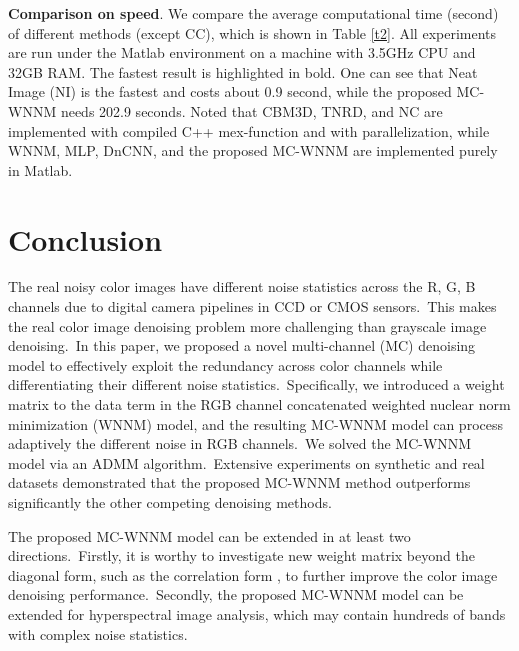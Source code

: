 \textbf{Comparison on speed}. We compare the average computational time (second) of different methods (except CC), which is shown in Table \ref{t2}. All experiments are run under the Matlab environment on a machine with 3.5GHz CPU and 32GB RAM. The fastest result is highlighted in bold. One can see that Neat Image (NI) is the fastest and costs about 0.9 second, while the proposed MC-WNNM needs 202.9 seconds. Noted that CBM3D, TNRD, and NC are implemented with compiled C++ mex-function and with parallelization, while WNNM, MLP, DnCNN, and the proposed MC-WNNM are implemented purely in Matlab.


\section{Conclusion}

The real noisy color images have different noise statistics across the R, G, B channels due to digital camera pipelines in CCD or CMOS sensors.\ This makes the real color image denoising problem more challenging than grayscale image denoising.\ In this paper, we proposed a novel multi-channel (MC) denoising model to effectively exploit the redundancy across color channels while differentiating their different noise statistics.\ Specifically, we introduced a weight matrix to the data term in the RGB channel concatenated weighted nuclear norm minimization (WNNM) model, and the resulting MC-WNNM model can process adaptively the different noise in RGB channels.\ We solved the MC-WNNM model via an ADMM algorithm.\ Extensive experiments on synthetic and real datasets demonstrated that the proposed MC-WNNM method outperforms significantly the other competing denoising methods.

The proposed MC-WNNM model can be extended in at least two directions.\ Firstly, it is worthy to investigate new weight matrix beyond the diagonal form, such as the correlation form \cite{nearcor}, to further improve the color image denoising performance.\ Secondly, the proposed MC-WNNM model can be extended for hyperspectral image analysis, which may contain hundreds of bands with complex noise statistics.